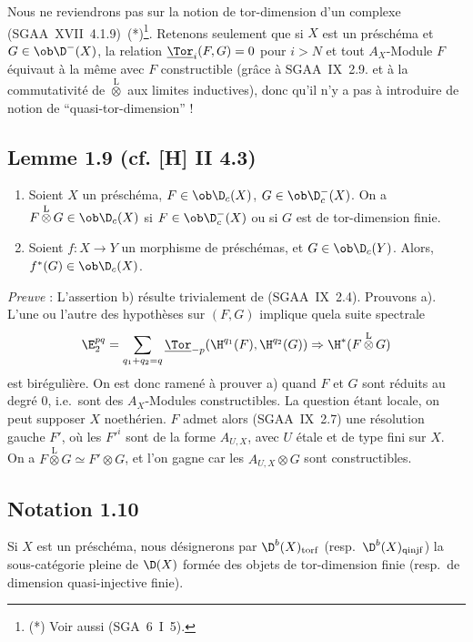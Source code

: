 Nous ne reviendrons pas sur la notion de tor-dimension d'un complexe (SGAA~XVII~4.1.9)~(*)\footnote{(*) Voir aussi (SGA~6~I~5).}. Retenons seulement que si $X$ est un préschéma et $G \in \ob \D^{-}(X)$, la relation $\underline{\Tor}_i(F,G) = 0$ pour $i > N$ et tout $A_X$-Module $F$ équivaut à la même avec $F$ constructible (grâce à SGAA~IX~2.9. et à la commutativité de $\mathop{\otimes}\limits^{\mathrm{L}}$ aux limites inductives), donc qu'il n'y a pas à introduire de notion de ``quasi-tor-dimension'' !

\subsection*{Lemme 1.9 (cf. [H] II 4.3)}
\begin{enumerate}
\item[a)] Soient $X$ un préschéma, $F \in \ob \D_c(X)$, $G \in \ob \D_c^{-}(X)$. On a $F \mathop{\otimes}\limits^{\mathrm{L}} G \in \ob \D_c(X)$ si $F \in \ob \D_c^{-}(X)$ ou si $G$ est de tor-dimension finie.
\item[b)] Soient $f : X \to Y$ un morphisme de préschémas, et $G \in \ob \D_c(Y)$. Alors, $f^{*}(G) \in \ob \D_c(X)$.
\end{enumerate}

\emph{Preuve} : L'assertion b) résulte trivialement de (SGAA~IX~2.4). Prouvons a). L'une ou l'autre des hypothèses sur $(F,G)$ implique quela suite spectrale
\[
\E_2^{pq} = \sum_{q_1+q_2=q} \underline{\Tor}_{-p}(\H^{q_1}(F), \H^{q_2}(G)) \Rightarrow \H^{*}(F \mathop{\otimes}\limits^{\mathrm{L}} G)
\]
est birégulière. On est donc ramené à prouver a) quand $F$ et $G$ sont réduits au degré $0$, i.e.~sont des $A_X$-Modules constructibles. La question étant locale, on peut supposer $X$ noethérien. $F$ admet alors (SGAA~IX~2.7) une résolution gauche $F'$, où les $F'^i$ sont de la forme $A_{U,X}$, avec $U$ étale et de type fini sur $X$. On a $F \mathop{\otimes}\limits^{\mathrm{L}} G \simeq F' \otimes G$, et l'on gagne car les $A_{U,X} \otimes G$ sont constructibles.

\subsection*{Notation 1.10}
Si $X$ est un préschéma, nous désignerons par $\D^{b}(X)_{\mathrm{torf}}$ (resp.~$\D^{b}(X)_{\mathrm{qinjf}}$) la sous-catégorie pleine de $\D(X)$ formée des objets de tor-dimension finie (resp.~de dimension quasi-injective finie).

